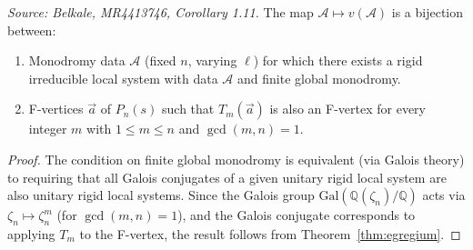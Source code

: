 \begin{corollary}[Egregiumprime]
  \label{cor:egregiumprime}
  \textit{Source: Belkale, MR4413746, Corollary 1.11.}
  The map \(\mathcal{A} \mapsto v(\mathcal{A})\) is a bijection between:
  \begin{enumerate}
    \item Monodromy data \(\mathcal{A}\) (fixed \(n\), varying \(\ell\)) for which there exists a rigid irreducible local system with data \(\mathcal{A}\) and finite global monodromy.
    \item F-vertices \(\vec{a}\) of \(P_n(s)\) such that \(T_m(\vec{a})\) is also an F-vertex for every integer \(m\) with \(1 \leq m \leq n\) and \(\gcd(m, n) = 1\).
  \end{enumerate}
\end{corollary}

\begin{proof}
  The condition on finite global monodromy is equivalent (via Galois theory) to requiring that all Galois conjugates of a given unitary rigid local system are also unitary rigid local systems. Since the Galois group \(\mathrm{Gal}(\mathbb{Q}(\zeta_n)/\mathbb{Q})\) acts via \(\zeta_n \mapsto \zeta_n^m\) (for \(\gcd(m,n)=1\)), and the Galois conjugate corresponds to applying \(T_m\) to the F-vertex, the result follows from Theorem~\cref{thm:egregium}.
\end{proof}

